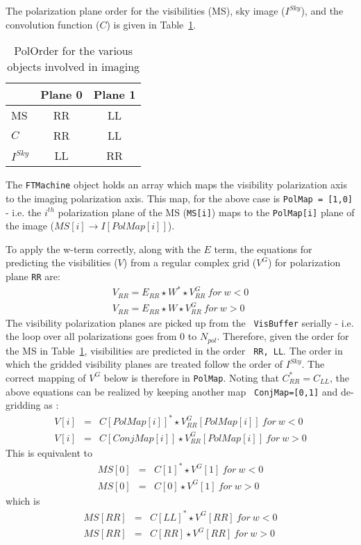 \documentclass[11pt,epsf]{article}
\begin{document}
The polarization plane order for the visibilities (MS), sky image
($I^{Sky}$), and the convolution function ($C$) is given in Table~\ref{TAB:POLORDER}.
\begin{table}[!ht]
\caption{PolOrder for the various objects involved in imaging}
\label{TAB:POLORDER}
\begin{center}
\begin{tabular}{|l|c|c|}
\hline
         & Plane 0 & Plane 1\\
\hline
MS       &  RR     &  LL\\
$C$      &  RR     & LL\\
$I^{Sky}$&  LL     &  RR\\
\hline
\end{tabular}
\end{center}
\end{table}
The {\tt FTMachine} object holds an array which maps the visibility
polarization axis to the imaging polarization axis.  This map, for the
above case is {\tt PolMap = [1,0]} - i.e. the $i^{th}$ polarization
plane of the MS ({\tt MS[i]}) maps to the {\tt PolMap[i]} plane of the
image ($MS[i] \rightarrow I[PolMap[i]]$).

To apply the w-term correctly, along with the $E$ term, the equations
for predicting the visibilities ($V$) from a regular complex grid
($V^G$) for polarization plane {\tt RR} are:
\begin{eqnarray}
 V_{RR} = E_{RR} \star W^* \star V^G_{RR}~for~w<0 \nonumber \\
 V_{RR} = E_{RR} \star W \star V^G_{RR}~for~w>0
\end{eqnarray}
The visibility polarization planes are picked up from the {\tt
  VisBuffer} serially - i.e. the loop over all polarizations goes from
0 to $N_{pol}$.  Therefore, given the order for the MS in
Table~\ref{TAB:POLORDER}, visibilities are predicted in the order {\tt
  RR, LL}.  The order in which the gridded visibility planes are
treated follow the order of $I^{Sky}$.  The correct mapping of $V^G$
below is therefore in {\tt PolMap}.  Noting that $C_{RR}^* = C_{LL}$,
the above equations can be realized by keeping another map {\tt
  ConjMap=[0,1]} and de-gridding as :
\begin{eqnarray}
 V[i] &=& C[PolMap[i]]^* \star V^G_{RR}[PolMap[i]]~for~w<0 \nonumber \\
 V[i] &=& C[ConjMap[i]] \star V^G_{RR}[PolMap[i]]~for~w>0 
\end{eqnarray}
This is equivalent to
\begin{eqnarray}
 MS[0]&=&C[1]^* \star V^G[1]~for~w<0\nonumber\\
 MS[0]&=&C[0] \star V^G[1]~for~w>0
\end{eqnarray}
which is 
\begin{eqnarray}
 MS[RR]&=&C[LL]^* \star V^G[RR]~for~w<0\nonumber\\
 MS[RR]&=&C[RR] \star V^G[RR]~for~w>0
\end{eqnarray}
\end{document}
